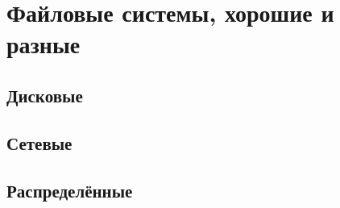 \chapter{Файловые системы, хорошие и разные}
\section{Дисковые}
\section{Сетевые}
\section{Распределённые}
